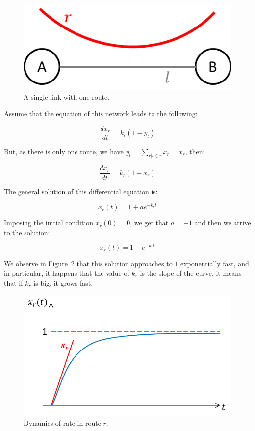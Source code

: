 \begin{figure}[h!]
\centering
\includegraphics[scale=.7]{1Link1Route}
\caption{A single link with one route.}
\label{figur1}
\end{figure}

Assume that the equation of this network leads to the following:

\begin{equation}
\frac{dx_r}{dt}=k_r(1 - y_{l})
\label{eq5}
\end{equation}

But, as there is only one route, we have $y_{l}=\sum\limits_{r | l \in r} x_r=x_{r}$, then:

\begin{equation}
\frac{dx_r}{dt}=k_r(1 - x_{r})
\label{eq6}
\end{equation}

The general solution of this differential equation is:

\begin{equation}
x_{r}(t)= 1 + a e^{-k_{r} t}
\label{eq7}
\end{equation}

Imposing the initial condition $x_{r}(0)=0$, we get that $a=-1$ and then we arrive to the solution:

\begin{equation}
x_{r}(t)= 1 - e^{-k_{r} t}
\label{eq8}
\end{equation}

We observe in Figure~\ref{figur2} that this solution approaches to $1$ exponentially fast, and in particular, it happens that the value of $k_r$ is the slope of the curve, it means that if $k_r$ is big, it grows fast.

\begin{figure}[h!]
\centering
\includegraphics[scale=.7]{rIn1Route}
\caption{Dynamics of rate in route $r$.}
\label{figur2}
\end{figure}


